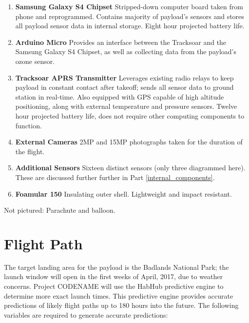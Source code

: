 \documentclass[english]{report}
\begin{document}
\begin{multicols}{2}
\begin{enumerate}
\item \textbf{Samsung Galaxy S4 Chipset} Stripped-down computer board taken
from phone and reprogrammed.  Contains majority of payload's sensors and stores all payload sensor data in internal storage. Eight hour projected battery life.
\item \textbf{Arduino Micro} Provides an interface between the Tracksoar and the Samsung Galaxy S4 Chipset, as well as collecting data from the payload's ozone sensor.
\item \textbf{Tracksoar APRS Transmitter} Leverages existing radio relays
to keep payload in constant contact after takeoff; sends all sensor
data to ground station in real-time.  Also equipped with GPS
capable of high altitude positioning, along with external temperature
and pressure sensors. Twelve hour projected battery life, does not require other computing components to function.
\item \textbf{External Cameras} 2MP and 15MP photographs taken for the duration
of the flight.
\item \textbf{Additional Sensors} Sixteen distinct sensors (only three diagrammed here).  These are discussed further further in Part \ref{internal_components}.
\item \textbf{Foamular 150} Insulating outer shell.  Lightweight and impact resistant.
\end{enumerate}
\end{multicols}
Not pictured: Parachute and balloon.

\pagebreak
\section{Flight Path}
\label{ground-station}
The target landing area for the payload is the Badlands National Park; the launch window will open in the first weeks of April, 2017, due to weather concerns.  Project CODENAME will use the HabHub\cite{HabHub} predictive engine to determine more exact launch times.  This predictive engine provides accurate predictions of likely flight paths up to 180 hours into the future. The following variables are required to generate accurate predictions:
\end{document}
